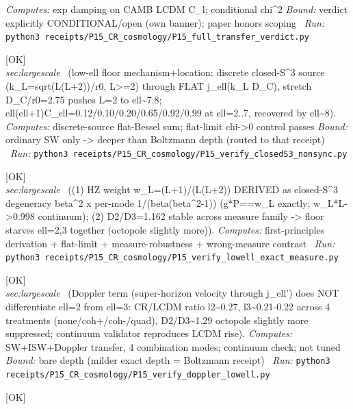 \begin{description}
\emph{Computes:} exp damping on CAMB LCDM C\_l; conditional chi\textasciicircum{}2
 \emph{Bound:} verdict explicitly CONDITIONAL/open (own banner); paper honors scoping
\ \emph{Run:} \texttt{python3 receipts/P15\_CR\_cosmology/P15\_full\_transfer\_verdict.py}
\item[\label{rcpt:P15_verify_closedS3_nonsync}\texttt{P15\_verify\_closedS3\_nonsync}]\hfill\textsf{[OK]}\\
\textit{sec:largescale} \ (low-ell floor mechanism+location: discrete closed-S\textasciicircum{}3 source (k\_L=sqrt(L(L+2))/r0, L>=2) through FLAT j\_ell(k\_L D\_C), stretch D\_C/r0=2.75 pushes L=2 to ell\textasciitilde{}7.8; ell(ell+1)C\_ell=0.12/0.10/0.20/0.65/0.92/0.99 at ell=2..7, recovered by ell\textasciitilde{}8). 
\emph{Computes:} discrete-source flat-Bessel sum; flat-limit chi->0 control passes
 \emph{Bound:} ordinary SW only -> deeper than Boltzmann depth (routed to that receipt)
\ \emph{Run:} \texttt{python3 receipts/P15\_CR\_cosmology/P15\_verify\_closedS3\_nonsync.py}
\item[\label{rcpt:P15_verify_lowell_exact_measure}\texttt{P15\_verify\_lowell\_exact\_measure}]\hfill\textsf{[OK]}\\
\textit{sec:largescale} \ ((1) HZ weight w\_L=(L+1)/(L(L+2)) DERIVED as closed-S\textasciicircum{}3 degeneracy beta\textasciicircum{}2 x per-mode 1/(beta(beta\textasciicircum{}2-1)) (g*P==w\_L exactly; w\_L*L->0.998 continuum); (2) D2/D3=1.162 stable across measure family -> floor starves ell=2,3 together (octopole slightly more)). 
\emph{Computes:} first-principles derivation + flat-limit + measure-robustness + wrong-measure contrast
\ \emph{Run:} \texttt{python3 receipts/P15\_CR\_cosmology/P15\_verify\_lowell\_exact\_measure.py}
\item[\label{rcpt:P15_verify_doppler_lowell}\texttt{P15\_verify\_doppler\_lowell}]\hfill\textsf{[OK]}\\
\textit{sec:largescale} \ (Doppler term (super-horizon velocity through j\_ell') does NOT differentiate ell=2 from ell=3: CR/LCDM ratio l2\textasciitilde{}0.27, l3\textasciitilde{}0.21-0.22 across 4 treatments (none/coh+/coh-/quad), D2/D3\textasciitilde{}1.29 octopole slightly more suppressed; continuum validator reproduces LCDM rise). 
\emph{Computes:} SW+ISW+Doppler transfer, 4 combination modes; continuum check; not tuned
 \emph{Bound:} bare depth (milder exact depth = Boltzmann receipt)
\ \emph{Run:} \texttt{python3 receipts/P15\_CR\_cosmology/P15\_verify\_doppler\_lowell.py}
\item[\label{rcpt:P15_verify_lowell_boltzmann}\texttt{P15\_verify\_lowell\_boltzmann}]\hfill\textsf{[OK]}\\

\end{description}
